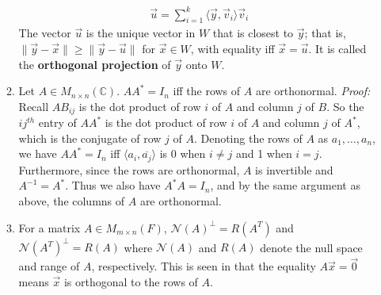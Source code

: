 \documentclass[10pt]{article}
\begin{document}
\begin{multicols*}{2}
\begin{enumerate}
\begin{enumerate}
        \begin{align*}
            \vec{u} = \sum_{i=1}^k \langle \vec{y}, \vec{v}_i \rangle \vec{v}_i
        \end{align*}
        The vector $\vec{u}$ is the unique vector in $W$ that is closest to $\vec{y}$; that is, $\| \vec{y} - \vec{x} \| \geq \| \vec{y} - \vec{u} \|$ for $\vec{x} \in W$, with equality iff $\vec{x}=\vec{u}$. It is called the \textbf{orthogonal projection} of $\vec{y}$ onto $W$.
        \item Let $A \in M_{n \times n}(\mathbb{C})$. $AA^*=I_n$ iff the rows of $A$ are orthonormal. \textit{Proof:} Recall $AB_{ij}$ is the dot product of row $i$ of $A$ and column $j$ of $B$. So the $ij^{th}$ entry of $AA^*$ is the dot product of row $i$ of $A$ and column $j$ of $A^*$, which is the conjugate of row $j$ of $A$. Denoting the rows of $A$ as $a_1, \hdots, a_n$, we have $AA^* = I_n$ iff $\langle a_i, \overline{a_j} \rangle$ is $0$ when $i \neq j$ and 1 when $i=j$. \\[6 pt]
        Furthermore, since the rows are orthonormal, $A$ is invertible and $A^{-1} = A^*$. Thus we also have $A^*A=I_n$, and by the same argument as above, the columns of $A$ are orthonormal.
        
        \item For a matrix $A \in M_{m \times n}(F)$, $\mathcal{N}(A)^\perp = R(A^T)$ and $\mathcal{N}(A^T)^\perp = R(A)$ where $\mathcal{N}(A)$ and $R(A)$ denote the null space and range of $A$, respectively. This is seen in that the equality $A\vec{x}=\vec{0}$ means $\vec{x}$ is orthogonal to the rows of $A$.
        

\end{enumerate}
\end{enumerate}
\end{multicols*}
\end{document}
